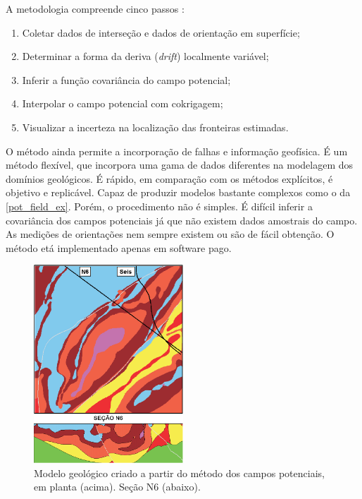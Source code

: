 A metodologia compreende cinco passos \cite{mclennan2006implicit}:

\begin{enumerate}
\item Coletar dados de interseção e dados de orientação em superfície;
\item Determinar a forma da deriva (\textit{drift}) localmente variável;
\item Inferir a função covariância do campo potencial;
\item Interpolar o campo potencial com cokrigagem;
\item Visualizar a incerteza na localização das fronteiras estimadas.
\end{enumerate}

O método ainda permite a incorporação de falhas e informação geofísica. É um método flexível, que incorpora uma gama de dados diferentes na modelagem dos domínios geológicos. É rápido, em comparação com os métodos explícitos, é objetivo e replicável. Capaz de produzir modelos bastante complexos como o da \autoref{pot_field_ex}. Porém, o procedimento não é simples. É difícil inferir a covariância dos campos potenciais já que não existem dados amostrais do campo. As medições de orientações nem sempre existem ou são de fácil obtenção. O método etá implementado apenas em software pago.

\begin{figure}[!htb]
	\caption{\label{pot_field_ex}Modelo geológico criado a partir do método dos campos potenciais, em planta (acima). Seção N6 (abaixo).}
	\begin{center}
		\includegraphics[width=0.5\textwidth]{revisao_bibliografica/pot_field_ex}
	\end{center}
\end{figure}